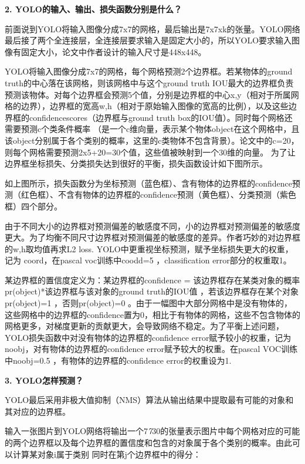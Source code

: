 \textbf{2. YOLO的输入、输出、损失函数分别是什么？}

前面说到YOLO将输入图像分成7x7的网格，最后输出是7x7xk的张量。YOLO网络最后接了两个全连接层，全连接层要求输入是固定大小的，所以YOLO要求输入图像有固定大小，论文中作者设计的输入尺寸是448x448。

YOLO将输入图像分成7x7的网格，每个网格预测2个边界框。若某物体的ground
truth的中心落在该网格，则该网格中与这个ground truth
IOU最大的边界框负责预测该物体。对每个边界框会预测5个值，分别是边界框的中心x,y（相对于所属网格的边界），边界框的宽高w,h（相对于原始输入图像的宽高的比例），以及这些边界框的confidencescores（边界框与ground
truth box的IOU值）。同时每个网格还需要预测c个类条件概率
（是一个c维向量，表示某个物体object在这个网格中，且该object分别属于各个类别的概率，这里的c类物体不包含背景）。论文中的c=20，则每个网格需要预测2x5+20=30个值，这些值被映射到一个30维的向量。
为了让边界框坐标损失、分类损失达到很好的平衡，损失函数设计如下图所示。

\begin{figure}
\centering
\caption{}
\end{figure}

如上图所示，损失函数分为坐标预测（蓝色框）、含有物体的边界框的confidence预测（红色框）、不含有物体的边界框的confidence预测（黄色框）、分类预测（紫色框）四个部分。

由于不同大小的边界框对预测偏差的敏感度不同，小的边界框对预测偏差的敏感度更大。为了均衡不同尺寸边界框对预测偏差的敏感度的差异。作者巧妙的对边界框的w,h取均值再求L2
loss. YOLO中更重视坐标预测，赋予坐标损失更大的权重，记为 coord，在pascal
voc训练中coodd=5 ，classification error部分的权重取1。

某边界框的置信度定义为：某边界框的confidence =
该边界框存在某类对象的概率pr(object)*该边界框与该对象的ground
truth的IOU值 ，若该边界框存在某个对象pr(object)=1 ，否则pr(object)=0
。由于一幅图中大部分网格中是没有物体的，这些网格中的边界框的confidence置为0，相比于有物体的网格，这些不包含物体的网格更多，对梯度更新的贡献更大，会导致网络不稳定。为了平衡上述问题，YOLO损失函数中对没有物体的边界框的confidence
error赋予较小的权重，记为 noobj，对有物体的边界框的confidence
error赋予较大的权重。在pascal VOC训练中noobj=0.5
，有物体的边界框的confidence error的权重设为1.

\textbf{3. YOLO怎样预测？}

YOLO最后采用非极大值抑制（NMS）算法从输出结果中提取最有可能的对象和其对应的边界框。

输入一张图片到YOLO网络将输出一个7\emph{7}30的张量表示图片中每个网格对应的可能的两个边界框以及每个边界框的置信度和包含的对象属于各个类别的概率。由此可以计算某对象i属于类别
同时在第j个边界框中的得分：

